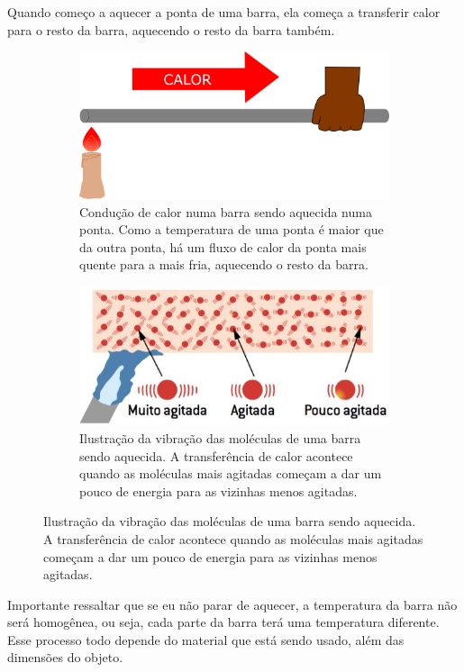 \documentclass[12pt]{extarticle}
\newcommand{\<}{\langle}
\renewcommand{\>}{\rangle}
\theoremstyle{definition}
\begin{document}
Quando começo a aquecer a ponta de uma barra, ela começa a transferir calor para o resto da barra, aquecendo o resto da barra também. 
\begin{figure}[h]
    \centering
    \begin{subfigure}[b]{0.4\textwidth}
         \centering
         \includegraphics[width=\textwidth]{conducao.png}
         \caption{Condução de calor numa barra sendo aquecida numa ponta. Como a temperatura de uma ponta é maior que da outra ponta, há um fluxo de calor da ponta mais quente para a mais fria, aquecendo o resto da barra.}
         \label{fig:cond_1}
     \end{subfigure}
     \hfill
     \begin{subfigure}[b]{0.4\textwidth}
         \centering
         \includegraphics[width=\textwidth]{20190503-transmissao-calor.jpg}
         \caption{Ilustração da vibração das moléculas de uma barra sendo aquecida. A transferência de calor acontece quando as moléculas mais agitadas começam a dar um pouco de energia para as vizinhas menos agitadas.}
         \label{fig:cond_2}
     \end{subfigure}
\end{figure}

Importante ressaltar que se eu não parar de aquecer, a temperatura da barra não será homogênea, ou seja, cada parte da barra terá uma temperatura diferente. Esse processo todo depende do material que está sendo usado, além das dimensões do objeto.
\end{document}
